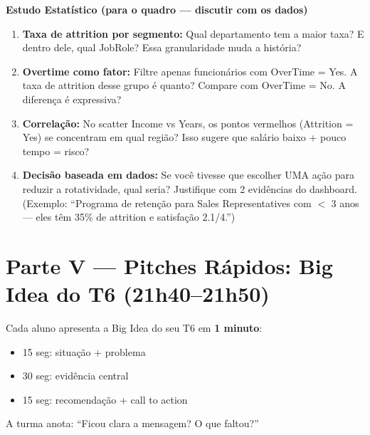 \begin{BoardBox}
\textbf{Estudo Estatístico (para o quadro — discutir com os dados)}

\begin{enumerate}
  \item \textbf{Taxa de attrition por segmento:} Qual departamento tem
  a maior taxa? E dentro dele, qual JobRole? Essa granularidade
  muda a história?

  \item \textbf{Overtime como fator:} Filtre apenas funcionários com
  OverTime = Yes. A taxa de attrition desse grupo é quanto?
  Compare com OverTime = No. A diferença é expressiva?

  \item \textbf{Correlação:} No scatter Income vs Years, os pontos
  vermelhos (Attrition = Yes) se concentram em qual região?
  Isso sugere que salário baixo + pouco tempo = risco?

  \item \textbf{Decisão baseada em dados:} Se você tivesse que
  escolher UMA ação para reduzir a rotatividade, qual seria?
  Justifique com 2 evidências do dashboard.
  (Exemplo: ``Programa de retenção para Sales Representatives
  com $<$ 3 anos — eles têm 35\% de attrition e satisfação 2.1/4.'')
\end{enumerate}
\end{BoardBox}

\section{Parte V — Pitches Rápidos: Big Idea do T6 (21h40–21h50)}

\begin{SolvedBox}
Cada aluno apresenta a Big Idea do seu T6 em \textbf{1 minuto}:
\begin{itemize}
  \item 15 seg: situação + problema
  \item 30 seg: evidência central
  \item 15 seg: recomendação + call to action
\end{itemize}

A turma anota: ``Ficou clara a mensagem? O que faltou?''
\end{SolvedBox}

